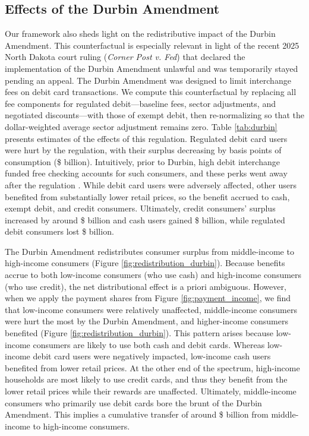 \documentclass[main.tex]{subfiles}
\begin{document}
\subsection{Effects of the Durbin Amendment}

Our framework also sheds light on the redistributive impact of the Durbin Amendment.
This counterfactual is especially relevant in light of the recent 2025 North Dakota court ruling (\textit{Corner Post v. Fed}) that declared the implementation of the Durbin Amendment unlawful and was temporarily stayed pending an appeal.
The Durbin Amendment was designed to limit interchange fees on debit card transactions.
We compute this counterfactual by replacing all fee components for regulated debit---baseline fees, sector adjustments, and negotiated discounts---with those of exempt debit, then re-normalizing so that the dollar-weighted average sector adjustment remains zero.
Table \ref{tab:durbin} presents estimates of the effects of this regulation.
Regulated debit card users were hurt by the regulation, with their surplus decreasing by  basis points of consumption (\$ billion).
Intuitively, prior to Durbin, high debit interchange funded free checking accounts for such consumers, and these perks went away after the regulation \citep{Mukharlyamov.Sarin2025}.
While debit card users were adversely affected, other users benefited from substantially lower retail prices, so the benefit accrued to cash, exempt debit, and credit consumers.
Ultimately, credit consumers' surplus increased by around \$ billion and cash users gained \$ billion, while regulated debit consumers lost \$ billion.

The Durbin Amendment redistributes consumer surplus from middle-income to high-income consumers (Figure \ref{fig:redistribution_durbin}).
Because benefits accrue to both low-income consumers (who use cash) and high-income consumers (who use credit), the net distributional effect is a priori ambiguous.
However, when we apply the payment shares from Figure \ref{fig:payment_income}, we find that low-income consumers were relatively unaffected, middle-income consumers were hurt the most by the Durbin Amendment, and higher-income consumers benefited (Figure \ref{fig:redistribution_durbin}).
This pattern arises because low-income consumers are likely to use both cash and debit cards.
Whereas low-income debit card users were negatively impacted, low-income cash users benefited from lower retail prices.
At the other end of the spectrum, high-income households are most likely to use credit cards, and thus they benefit from the lower retail prices while their rewards are unaffected.
Ultimately, middle-income consumers who primarily use debit cards bore the brunt of the Durbin Amendment.
This implies a cumulative transfer of around \$ billion from middle-income to high-income consumers.
\end{document}
